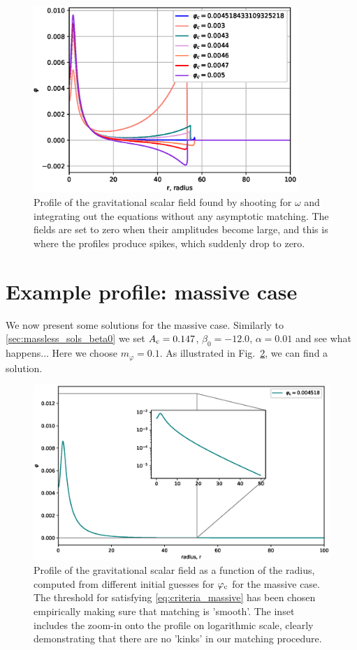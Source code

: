 \documentclass[12pt]{article}
\numberwithin{equation}{section}
\begin{document}
\begin{figure}
    \centering
    \includegraphics[width=10cm]{zero_crossings.eps}
    \caption{Profile of the gravitational scalar field found by shooting for $\omega$ and integrating out the equations without any asymptotic matching. The fields are set to zero when their amplitudes become large, and this is where the profiles produce spikes, which suddenly drop to zero.}
    \label{zero-crossings}
\end{figure}

\section{Example profile: massive case}
We now present some solutions for the massive case. Similarly to \ref{sec:massless_sols_beta0} we set $A_{\rm c} = 0.147$, $\beta_0 = -12.0$, $\alpha = 0.01$ and see what happens... Here we choose $m_{\varphi} = 0.1$. As illustrated in Fig.~\ref{model-beta-12-massive}, we can find a solution.
\begin{figure}
    \centering
    \includegraphics[width=15cm]{model-beta-12-massive.eps}
    \caption{Profile of the gravitational scalar field as a function of the radius, computed from different initial guesses for $\varphi_{\rm{c}}$ for the massive case. The threshold for satisfying \eqref{eq:criteria_massive} has been chosen empirically making sure that matching is 'smooth'. The inset includes the zoom-in onto the profile on logarithmic scale, clearly demonstrating that there are no 'kinks' in our matching procedure.}
    \label{model-beta-12-massive}
\end{figure}

\newpage


\end{document}
